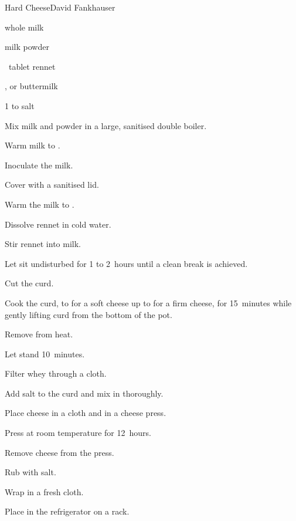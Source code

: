 \begin{recipe}{Hard Cheese}{David Fankhauser}{}

\begin{ingredients}
\item {} whole milk
\item \C{\half} milk powder
\item \half{}~tablet rennet
\item \C{\quarter} , or buttermilk 
\item 1 to  salt
\end{ingredients}

\begin{directions}
\item Mix milk and powder in a large, sanitised double boiler.
\item Warm milk to .
\item Inoculate the milk.
\item Cover with a sanitised lid.
\end{directions}

\begin{directions}
\item Warm the milk to .
\item Dissolve rennet in \C{\quarter} cold water.
\item Stir rennet into milk.
\item Let sit undisturbed for 1 to 2~hours until a clean break is achieved.
\item Cut the curd.
\item Cook the curd, to  for a soft cheese up to  for a firm cheese, for 15~minutes while gently lifting curd from the bottom of the pot.
\item Remove from heat.
\item Let stand 10~minutes.
\item Filter whey through a cloth.
\item Add salt to the curd and mix in thoroughly.
\item Place cheese in a cloth and in a cheese press.
\item Press at room temperature for 12~hours.
\end{directions}

\begin{directions}
\item Remove cheese from the press.
\item Rub with salt.
\item Wrap in a fresh cloth.
\item Place in the refrigerator on a rack.
\end{directions}


\end{recipe}
